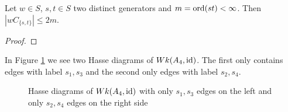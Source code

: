 \begin{lemm}
	Let $w \in S$, $s,t \in S$ two distinct generators and $m = \operatorname{ord}(st) < \infty$. Then $|wC_{\{s,t\}}| \leq 2m$.

	\begin{proof}
		\todo
	\end{proof}
\end{lemm}

\begin{exam}
	In Figure \ref{fig:a4_s1s3-and-a4_s2s4} we see two Hasse diagrams of $Wk(A_4, \operatorname{id})$. The first only contains edges with label $s_1,s_3$ and the second only edges with label $s_2,s_4$.
	\begin{figure}[ht]
		\centering
		
		\quad \quad \quad
		
		\caption{Hasse diagrams of $Wk(A_4, \operatorname{id})$ with only $s_1,s_3$ edges on the left and only $s_2,s_4$ edges on the right side}
		\label{fig:a4_s1s3-and-a4_s2s4}
	\end{figure}
\end{exam}